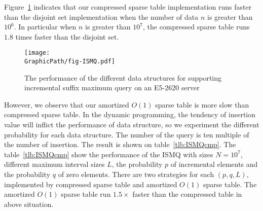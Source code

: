 \iffalse
\begin{itemize}
  \item 并查集 (Disjoint Set): 平均運行時間 $o(\alpha(n))$。只使用路徑壓縮技巧。
  \item 稀疏表 (Sparse Table): 插入 $O(\log n)$、詢問 $O(1)$。實作陣列宣告採用 $\tt{table}[\log N][N]$ 以減少快取未中。
  \item 樹狀數組 (Binary Indexed Tree): 插入、詢問均為 $O(\log n)$。
  \item 壓縮稀疏表 (Compressed Sparse Tree): 插入均攤 $O(1)$、詢問操作 $O(s)$，
  其中 $s$ 為拆分到區塊大小。實作時，維護區塊前綴和後綴最大值降低詢問複雜度至 $O(1)$，當發生 in-block 詢問再運行 $O(s)$ 算法。
\end{itemize}
\fi

Figure~\ref{fig:fig-ISMQcmp} indicates that our compressed sparse
table implementation runs faster than the disjoint set implementation
when the number of data $n$ is greater than $10^6$.  In particular
when $n$ is greater than $10^7$, the compressed sparse table runs
$1.8$ times faster than the disjoint set.

\begin{figure}[!thb]
  \centering
  \texttt{[image: \\GraphicPath/fig-ISMQ.pdf]}

  \caption{The performance of the different data structures for
    supporting incremental suffix maximum query on an E5-2620 server}
  \label{fig:fig-ISMQcmp}
\end{figure}

However, we observe that our amortized $O(1)$ sparse table is more
slow than compressed sparse table.  In the dynamic programming, the
tendency of insertion value will inflict the performance of data
structure, so we experiment the different probability for each data
structure.  The number of the query is ten multiple of the number of
insertion.  The result is shown on table~\ref{tlb:ISMQcmp}.  The
table~\ref{tlb:ISMQcmp} show the performance of the ISMQ with sizes $N
= 10^7$, different maximum interval sizes $L$, the probability $p$ of
incremental elements and the probability $q$ of zero elements. There
are two strategies for each $(p, q, L)$, implemented by compressed
sparse table and amortized $O(1)$ sparse table.  The amortized $O(1)$
sparse table run $1.5 \times$ faster than the compressed table in
above situation.

\iffalse 當運行 $n > 10^6$ 時，我們提出的壓縮稀疏表的效能已經勝過并查
集的版本，其運行結果如圖表 ~\ref{fig:fig-ISMQcmp}。在 $n = 10^7$ 時，
加速 $1.25 \times$。然而，我們提供的 amortized $\theta(1)$ 的稀疏表慢
於并查集，我們做了深入的機率探討 (參照表 ~\ref{tlb:ISMQcmp})，由於大部
分的操作都被區塊後綴和前綴解決，沒有實際運用到內部詢問，約束區間詢問的
大小為 $L$，在 $N = 10^7$ 時，最多能加速 $1.26 \times$，其中插入和詢問
比例為 1:10，當詢問比重更大時，將有更明顯的加速。\fi

